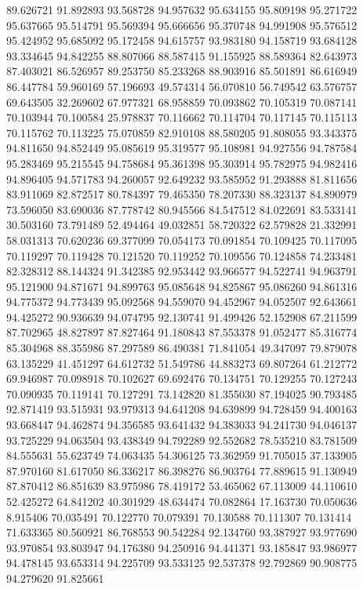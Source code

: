 89.626721
91.892893
93.568728
94.957632
95.634155
95.809198
95.271722
95.637665
95.514791
95.569394
95.666656
95.370748
94.991908
95.576512
95.424952
95.685092
95.172458
94.615757
93.983180
94.158719
93.684128
93.334645
94.842255
88.807066
88.587415
91.155925
88.589364
82.643973
87.403021
86.526957
89.253750
85.233268
88.903916
85.501891
86.616949
86.447784
59.960169
57.196693
49.574314
56.070810
56.749542
63.576757
69.643505
32.269602
67.977321
68.958859
70.093862
70.105319
70.087141
70.103944
70.100584
25.978837
70.116662
70.114704
70.117145
70.115113
70.115762
70.113225
75.070859
82.910108
88.580205
91.808055
93.343375
94.811650
94.852449
95.085619
95.319577
95.108981
94.927556
94.787584
95.283469
95.215545
94.758684
95.361398
95.303914
95.782975
94.982416
94.896405
94.571783
94.260057
92.649232
93.585952
91.293888
81.811656
83.911069
82.872517
80.784397
79.465350
78.207330
88.323137
84.890979
73.596050
83.690036
87.778742
80.945566
84.547512
84.022691
83.533141
30.503160
73.791489
52.494464
49.032851
58.720322
62.579828
21.332991
58.031313
70.620236
69.377099
70.054173
70.091854
70.109425
70.117095
70.119297
70.119428
70.121520
70.119252
70.109556
70.124858
74.233481
82.328312
88.144324
91.342385
92.953442
93.966577
94.522741
94.963791
95.121900
94.871671
94.899763
95.085648
94.825867
95.086260
94.861316
94.775372
94.773439
95.092568
94.559070
94.452967
94.052507
92.643661
94.425272
90.936639
94.074795
92.130741
91.499426
52.152908
67.211599
87.702965
48.827897
87.827464
91.180843
87.553378
91.052477
85.316774
85.304968
88.355986
87.297589
86.490381
71.841054
49.347097
79.879078
63.135229
41.451297
64.612732
51.549786
44.883273
69.807264
61.212772
69.946987
70.098918
70.102627
69.692476
70.134751
70.129255
70.127243
70.090935
70.119141
70.127291
73.142820
81.355030
87.194025
90.793485
92.871419
93.515931
93.979313
94.641208
94.639899
94.728459
94.400163
93.668447
94.462874
94.356585
93.641432
94.383033
94.241730
94.046137
93.725229
94.063504
93.438349
94.792289
92.552682
78.535210
83.781509
84.555631
55.623749
74.063435
54.306125
73.362959
91.705015
37.133905
87.970160
81.617050
86.336217
86.398276
86.903764
77.889615
91.130949
87.870412
86.851639
83.975986
78.419172
53.465062
67.113009
44.110610
52.425272
64.841202
40.301929
48.634474
70.082864
17.163730
70.050636
8.915406
70.035491
70.122770
70.079391
70.130588
70.111307
70.131414
71.633365
80.560921
86.768553
90.542284
92.134760
93.387927
93.977690
93.970854
93.803947
94.176380
94.250916
94.441371
93.185847
93.986977
94.478145
93.653314
94.225709
93.533125
92.537378
92.792869
90.908775
94.279620
91.825661
